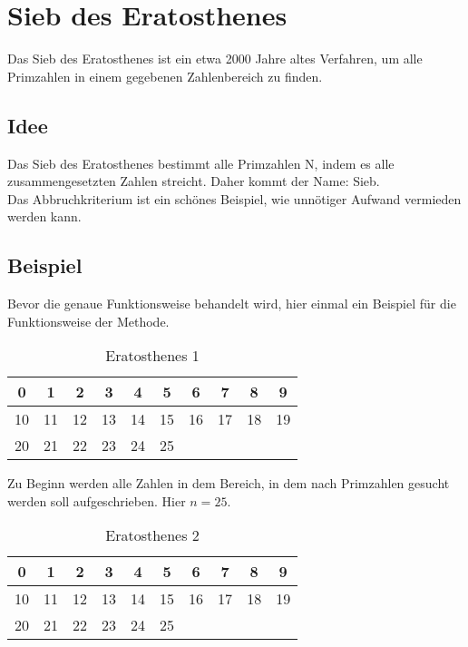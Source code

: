 

	\section{Sieb des Eratosthenes}
	 \label{sec:eratosthenes}
	Das Sieb des Eratosthenes ist ein etwa 2000 Jahre altes Verfahren, um alle Primzahlen in einem gegebenen Zahlenbereich zu finden.
	 
	\subsection{Idee}
	Das Sieb des Eratosthenes bestimmt alle Primzahlen N, indem es alle zusammengesetzten Zahlen streicht. Daher kommt der Name: Sieb.\\
	Das Abbruchkriterium ist ein sch\"ones Beispiel, wie unn\"otiger Aufwand vermieden werden kann.
	
	\subsection{Beispiel}
	Bevor die genaue Funktionsweise behandelt wird, hier einmal ein Beispiel f\"ur die Funktionsweise der Methode.\\
	\begin{table}[!ht] 
		\centering
		
		\begin{tabular}{|c|c|c|c|c|c|c|c|c|c|}
			\hline
			0  &  1 &  2 &  3 &  4 &  5 &  6 &  7 &  8 &  9 \\
			\hline
			10 & 11 & 12 & 13 & 14 & 15 & 16 & 17 & 18 & 19 \\
			\hline
			20 & 21 & 22 & 23 & 24 & 25 &  &  &  &  \\
			\hline
		\end{tabular}
		\caption{Eratosthenes 1}
		\label{tab:eratosthenes1}
	\end{table}
	
	\noindent Zu Beginn werden alle Zahlen in dem Bereich, in dem nach Primzahlen gesucht werden soll aufgeschrieben. Hier $n=25$.
	
	\begin{table}[!ht] 
		\centering
		\begin{tabular}{|c|c|c|c|c|c|c|c|c|c|}
			\hline
			\cellcolor{red}0  &  \cellcolor{red}1 &  2 &  3 &  4 &  5 &  6 &  7 &  8 &  9 \\
			\hline
			10 & 11 & 12 & 13 & 14 & 15 & 16 & 17 & 18 & 19 \\
			\hline
			20 & 21 & 22 & 23 & 24 & 25 &  &  &  &  \\
			\hline
		\end{tabular}
		\caption{Eratosthenes 2}
		\label{tab:eratosthenes2}
	\end{table}
	

